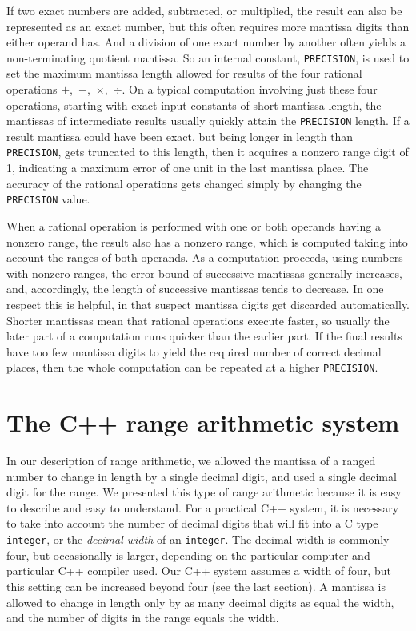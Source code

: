 If two exact numbers are added, subtracted, or multiplied,
the result can also be represented as an exact number, but this
often requires more mantissa digits than either operand has.
And a division of one exact number by another often yields
a non-terminating quotient mantissa. So an internal constant,
{\tt PRECISION}, is used to set the maximum mantissa length allowed
for results of the four rational operations \hbox{$+$, $-$, $\times$, $\div$}.
On a typical computation involving just these four operations, starting
with exact input constants of short
mantissa length, the mantissas of intermediate results usually
quickly attain the {\tt PRECISION} length. If a result mantissa could
have been exact, but being longer in length than {\tt PRECISION}, gets
truncated to this length, then it acquires a nonzero range digit of 1,
indicating a maximum error of one unit in the last mantissa place.
The accuracy of the rational operations gets changed simply by
changing the {\tt PRECISION} value.

When a rational operation is performed with one or both operands having
a nonzero range, the result also has a nonzero range,
which is computed taking into account the ranges of both operands.
As a computation proceeds, using numbers with nonzero ranges, the
error bound of successive mantissas generally increases, and, accordingly,
the length of successive mantissas tends to decrease. In one respect
this is helpful, in
that suspect mantissa digits get discarded automatically.
Shorter mantissas mean that rational operations execute faster,
so usually the later part of a computation runs quicker than the earlier
part. If the final results have too few mantissa digits to yield the
required number of correct decimal places, then the whole computation
can be repeated at a higher {\tt PRECISION}.  

\section{The C++ range arithmetic system}
In our description of range arithmetic, we allowed the mantissa of a ranged
number to change in length by a single decimal digit, and used a single
decimal digit for the range.
We presented this type of range arithmetic because it is easy
to describe and easy to understand. For a practical C++ system,
it is necessary to take into account the number of 
decimal digits that will
fit into a C type {\tt integer}, or the {\sl decimal width}
of an {\tt integer}. 
The decimal width is commonly four, but occasionally is larger,
depending on the particular computer and particular C++ compiler used.
Our C++ system assumes a width of four, but this setting can be increased
beyond four (see the last section).
A mantissa is allowed to change in length only
by as many decimal digits as equal the width, and the number of digits
in the range equals the width.

